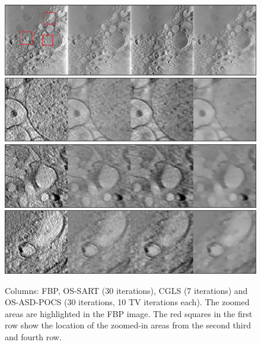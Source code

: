 \begin{figure}
\begin{center}

\includegraphics[width=\textwidth]{Applications/Diamond1_full_marked.png} 
\includegraphics[width=\textwidth]{Applications/Diamond1zoom1.png} 
\includegraphics[width=\textwidth]{Applications/Diamond1zoom2.png} 
\includegraphics[width=\textwidth]{Applications/Diamond1zoom3.png} 

\end{center}

\caption[Cell image recosntructed with different algorithms 2]{\label{fig:Diamond2} Columns: FBP, OS-SART (30 iterations), CGLS (7 iterations) and OS-ASD-POCS (30 iterations, 10 TV iterations each). The zoomed areas are highlighted in the FBP image.  The red squares in the first row show the location of the zoomed-in areas from the second third and fourth row.} 
\end{figure}
